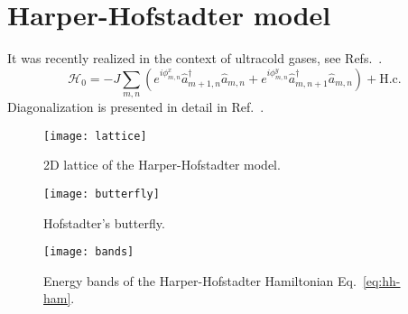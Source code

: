 \section{Harper-Hofstadter model}
\label{sec:hh-atoms}
It was recently realized in the context of ultracold gases, see
Refs.~\cite{aidelsburger2013hh,miyake2013hh}.
%
\begin{equation}\label{eq:hh-ham}
  \mathcal{H}_0 = -J\sum_{m,n}(e^{i
    \phi_{m,n}^x}\hat{a}_{m+1,n}^{\dagger}\hat{a}_{m,n} +e^{i
    \phi_{m,n}^y}\hat{a}_{m,n+1}^{\dagger}\hat{a}_{m,n}) + \text{H.c.}
\end{equation}
% 
Diagonalization is presented in detail in
Ref.~\cite{jain2007composite}.
%
\begin{figure}[tb]\centering
  \texttt{[image: lattice]}
  \caption{
    2D lattice of the Harper-Hofstadter model.
  }\label{fig:hh-lattice}
\end{figure}
% 
%
\begin{figure}[tb]\centering
  \texttt{[image: butterfly]}
  \caption{
    Hofstadter's butterfly. 
  }\label{fig:butterfly}
\end{figure}
% 
%
\begin{figure}[tb]\centering
  \texttt{[image: bands]}
  \caption{
    Energy bands of the Harper-Hofstadter Hamiltonian Eq.~\eqref{eq:hh-ham}.
  }\label{fig:hh-energy-levels}
\end{figure}
% 

